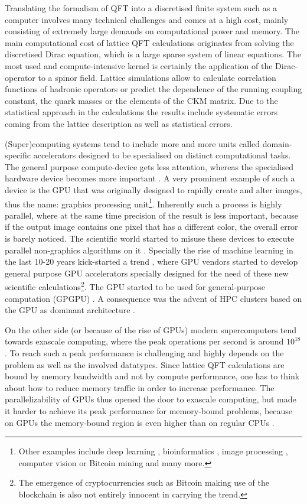 \documentclass{article}
\theoremstyle{plain} %
\theoremstyle{convention} %
\theoremstyle{remark} %
\numberwithin{equation}{section}
\begin{document}
Translating the formalism of QFT into a discretised finite system such as a computer involves many technical challenges and comes at a high cost, mainly consisting of extremely large demands on computational power and memory. The main computational cost of lattice QFT calculations originates from solving the discretised Dirac equation, which is a large sparse system of linear equations. The most used and compute-intensive kernel is certainly the application of the Dirac-operator to a spinor field. Lattice simulations allow to calculate correlation functions of hadronic operators or predict the dependence of the running coupling constant, the quark masses or the elements of the CKM matrix. Due to the statistical approach in the calculations the results include systematic errors coming from the lattice description as well as statistical errors.

(Super)computing systems tend to include more and more units called domain-specific accelerators \cite{cong2010} designed to be specialised on distinct computational tasks. The general purpose compute-device gets less attention, whereas the specialised hardware device becomes more important \cite{pan2018}. A very prominent example of such a device is the GPU that was originally designed to rapidly create and alter images, thus the name: graphics processing unit\footnote{Other examples include deep learning \cite{han2016}, bioinformatics \cite{turakhia2018}, image processing \cite{qadeer2013}, computer vision \cite{sun2018} or Bitcoin mining \cite{satoh2007} and many more.}. Inherently such a process is highly parallel, where at the same time precision of the result is less important, because if the output image contains one pixel that has a different color, the overall error is barely noticed. The scientific world started to misuse these devices to execute parallel non-graphics algorithms on it \cite{brodtkorb2013}. Specially the rise of machine learning in the last \num{10}-\num{20} years kick-started a trend \cite{steinkraus2005}, where GPU vendors started to develop general purpose GPU accelerators specially designed for the need of these new scientific calculations\footnote{The emergence of cryptocurrencies such as Bitcoin \cite{nakamoto2019} making use of the blockchain is also not entirely innocent in carrying the trend.}. The GPU started to be used for general-purpose computation (GPGPU) \cite{luebke2004}. A consequence was the advent of HPC clusters based on the GPU as dominant architecture \cite{kindratenko2011}.

On the other side (or because of the rise of GPUs) modern supercomputers tend towards exascale computing, where the peak operations per second is around $10^{18}$. To reach such a peak performance is challenging and highly depends on the problem as well as the involved datatypes. Since lattice QFT calculations are bound by memory bandwidth and not by compute performance, one has to think about how to reduce memory traffic in order to increase performance. The parallelizability of GPUs thus opened the door to exascale computing, but made it harder to achieve its peak performance for memory-bound problems, because on GPUs the memory-bound region is even higher than on regular CPUs \cite{davis2012}.
\end{document}
